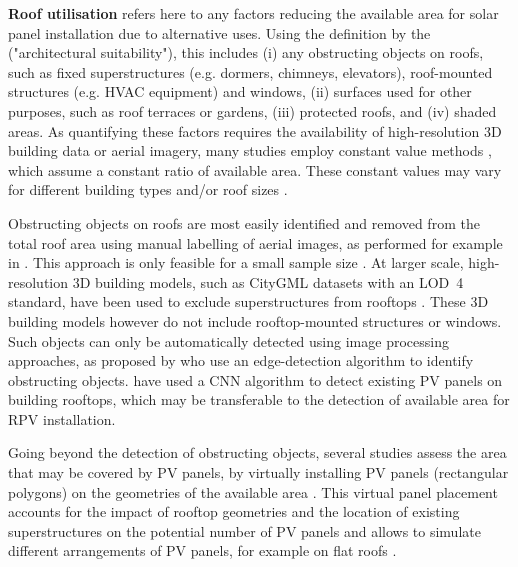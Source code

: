 \textbf{Roof utilisation} refers here to any factors reducing the available area for solar panel installation due to alternative uses. Using the definition by the \citet{iea_potential_2002} ("architectural suitability"), this includes (i) any obstructing objects on roofs, such as fixed superstructures (e.g. dormers, chimneys, elevators), roof-mounted structures (e.g. HVAC equipment) and windows, (ii) surfaces used for other purposes, such as roof terraces or gardens, (iii) protected roofs, and (iv) shaded areas. As quantifying these factors requires the availability of high-resolution 3D building data or aerial imagery, many studies employ constant value methods \cite{assouline_estimation_2017}, which assume a constant ratio of available area. These constant values may vary for different building types and/or roof sizes \cite{wegertseder_combining_2016,portmann_sonnendach.ch:_2016,wiginton_quantifying_2010}. 

Obstructing objects on roofs are most easily identified and removed from the total roof area using manual labelling of aerial images, as performed for example in \cite{ordonez_analysis_2010,strzalka_large_2012}. This approach is only feasible for a small sample size \cite{ordonez_analysis_2010}.
At larger scale, high-resolution 3D building models, such as CityGML datasets with an LOD~4 standard, have been used to exclude superstructures from rooftops \cite{assouline_quantifying_2017}.
These 3D building models however do not include rooftop-mounted structures or windows.
Such objects can only be automatically detected using image processing approaches, as proposed by \citet{mainzer_assessment_2017} who use an edge-detection algorithm to identify obstructing objects.
\citet{castello_deep_2019} have used a CNN algorithm to detect existing PV panels on building rooftops, which may be transferable to the detection of available area for RPV installation.

Going beyond the detection of obstructing objects, several studies assess the area that may be covered by PV panels, by virtually installing PV panels (rectangular polygons) on the geometries of the available area \cite{ordonez_analysis_2010,mainzer_assessment_2017,assouline_large-scale_2018}. 
This virtual panel placement accounts for the impact of rooftop geometries and the location of existing superstructures on the potential number of PV panels and allows to simulate different arrangements of PV panels, for example on flat roofs \cite{ordonez_analysis_2010}.

